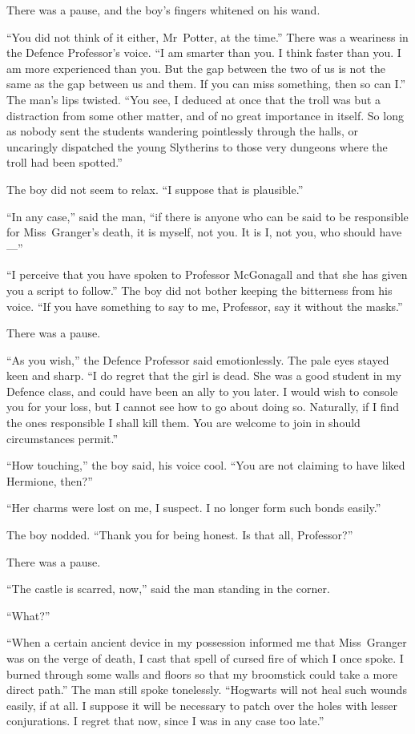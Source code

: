 There was a pause, and the boy’s fingers whitened on his wand.

“You did not think of it either, Mr~Potter, at the time.” There was a weariness in the Defence Professor’s voice. “I am smarter than you. I think faster than you. I am more experienced than you. But the gap between the two of us is not the same as the gap between us and them. If you can miss something, then so can I.” The man’s lips twisted. “You see, I deduced at once that the troll was but a distraction from some other matter, and of no great importance in itself. So long as nobody sent the students wandering pointlessly through the halls, or uncaringly dispatched the young Slytherins to those very dungeons where the troll had been spotted.”

The boy did not seem to relax. “I suppose that is plausible.”

“In any case,” said the man, “if there is anyone who can be said to be responsible for Miss~Granger’s death, it is myself, not you. It is I, not you, who should have—”

“I perceive that you have spoken to Professor McGonagall and that she has given you a script to follow.” The boy did not bother keeping the bitterness from his voice. “If you have something to say to me, Professor, say it without the masks.”

There was a pause.

“As you wish,” the Defence Professor said emotionlessly. The pale eyes stayed keen and sharp. “I do regret that the girl is dead. She was a good student in my Defence class, and could have been an ally to you later. I would wish to console you for your loss, but I cannot see how to go about doing so. Naturally, if I find the ones responsible I shall kill them. You are welcome to join in should circumstances permit.”

“How touching,” the boy said, his voice cool. “You are not claiming to have liked Hermione, then?”

“Her charms were lost on me, I suspect. I no longer form such bonds easily.”

The boy nodded. “Thank you for being honest. Is that all, Professor?”

There was a pause.

“The castle is scarred, now,” said the man standing in the corner.

“What?”

“When a certain ancient device in my possession informed me that Miss~Granger was on the verge of death, I cast that spell of cursed fire of which I once spoke. I burned through some walls and floors so that my broomstick could take a more direct path.” The man still spoke tonelessly. “Hogwarts will not heal such wounds easily, if at all. I suppose it will be necessary to patch over the holes with lesser conjurations. I regret that now, since I was in any case too late.”

